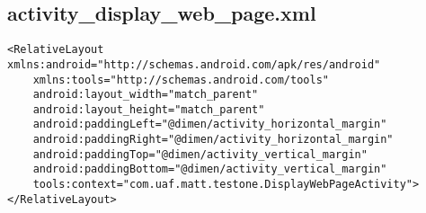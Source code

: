 \subsection{activity\_display\_web\_page.xml}
\label{app:cawebxml}
\begin{lstlisting}
<RelativeLayout xmlns:android="http://schemas.android.com/apk/res/android"
    xmlns:tools="http://schemas.android.com/tools"
    android:layout_width="match_parent"
    android:layout_height="match_parent"
    android:paddingLeft="@dimen/activity_horizontal_margin"
    android:paddingRight="@dimen/activity_horizontal_margin"
    android:paddingTop="@dimen/activity_vertical_margin"
    android:paddingBottom="@dimen/activity_vertical_margin"
    tools:context="com.uaf.matt.testone.DisplayWebPageActivity">
</RelativeLayout>
\end{lstlisting}